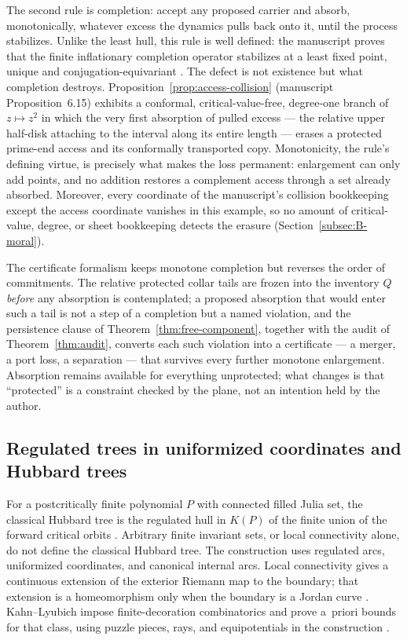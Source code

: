 The second rule is completion: accept any proposed carrier and absorb,
monotonically, whatever excess the dynamics pulls back onto it, until the
process stabilizes.  Unlike the least hull, this rule is well defined:
the manuscript proves that the finite inflationary completion operator
stabilizes at a least fixed point, unique and conjugation-equivariant
\cite[Theorem~6.14]{MWman}.  The defect is not existence but what
completion destroys.  Proposition~\ref{prop:access-collision} (manuscript
Proposition~6.15) exhibits a conformal, critical-value-free, degree-one
branch of $z\mapsto z^2$ in which the very first absorption of pulled
excess --- the relative upper half-disk attaching to the interval along
its entire length --- erases a protected prime-end access and its
conformally transported copy.  Monotonicity, the rule's defining virtue,
is precisely what makes the loss permanent: enlargement can only add
points, and no addition restores a complement access through a set
already absorbed.  Moreover, every coordinate of the manuscript's
collision bookkeeping except the access coordinate vanishes in this
example, so no amount of critical-value, degree, or sheet bookkeeping
detects the erasure (Section~\ref{subsec:B-moral}).

The certificate formalism keeps monotone completion but reverses the
order of commitments.  The relative protected collar tails are frozen into the
inventory $Q$ \emph{before} any absorption is contemplated; a proposed
absorption that would enter such a tail is not a step of a completion
but a named violation, and the persistence clause of
Theorem~\ref{thm:free-component}, together with the audit of
Theorem~\ref{thm:audit}, converts each such violation into a certificate
--- a merger, a port loss, a separation --- that survives every further
monotone enlargement.  Absorption remains available for everything
unprotected; what changes is that ``protected'' is a constraint checked
by the plane, not an intention held by the author.

\subsection[Regulated and Hubbard trees]
{Regulated trees in uniformized coordinates and Hubbard trees}
\label{subsec:A-comp-trees}

For a postcritically finite polynomial $P$ with connected filled Julia
set, the classical Hubbard tree is the regulated hull in $K(P)$ of the
finite union of the forward critical orbits \cite{DHOrsay}.  Arbitrary finite
invariant sets, or local connectivity alone, do not define the classical
Hubbard tree.  The construction uses regulated arcs, uniformized
coordinates, and canonical internal arcs.  Local connectivity gives a
continuous extension of the exterior Riemann map to the boundary; that
extension is a homeomorphism only when the boundary is a Jordan curve
\cite{DHOrsay,Pom92}.  Kahn--Lyubich impose finite-decoration combinatorics
and prove a~priori bounds for that class, using puzzle pieces, rays, and
equipotentials in the construction \cite{KL08}.

